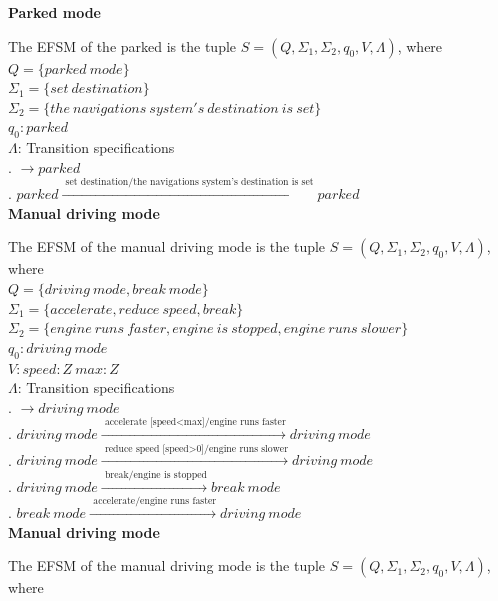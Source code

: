 \documentclass[12pt]{article}
\begin{document}
\begin{spacing}{1.5}
\newpage
\noindent \textbf{Parked mode}

\noindent The EFSM of the parked is the tuple $S = (Q, \Sigma_1, \Sigma_2, q_0, V, \Lambda)$, where\\

\noindent $Q = \{parked~mode\}$\\
\noindent $\Sigma_1 = \{set~destination\}$\\
\noindent $\Sigma_2 = \{the~navigations~system's~destination~is~set\}$\\
\noindent $q_0: parked$\\
\noindent $\Lambda$: Transition specifications\\
. $\rightarrow parked$\\
. $parked \xrightarrow {\text { set~destination/the~navigations~system's~destination~is~set}} parked$\\

\newpage
\noindent \textbf{Manual driving mode}

\noindent The EFSM of the manual driving mode is the tuple $S = (Q, \Sigma_1, \Sigma_2, q_0, V, \Lambda)$, where\\

\noindent $Q = \{driving~mode, break~mode\}$\\
\noindent $\Sigma_1 = \{accelerate,reduce~speed,break\}$\\
\noindent $\Sigma_2 = \{engine~runs~faster,engine~is~stopped,
engine~runs~slower\}$\\
\noindent $q_0: driving~mode$\\
\noindent $V: speed:Z~max:Z$\\
\noindent $\Lambda$: Transition specifications\\
. $\rightarrow driving~mode$\\
. $driving~mode \xrightarrow {\text { accelerate~[speed<max]/engine~runs~faster}} driving~mode$\\
. $driving~mode \xrightarrow {\text { reduce~speed~[speed>0]/engine~runs~slower}} driving~mode$\\
. $driving~mode \xrightarrow {\text { break/engine~is~stopped}} break~mode$\\
. $break~mode \xrightarrow {\text { accelerate/engine~runs~faster}} driving~mode$\\
\newpage
\noindent \textbf{Manual driving mode}

\noindent The EFSM of the manual driving mode is the tuple $S = (Q, \Sigma_1, \Sigma_2, q_0, V, \Lambda)$, where\\


\end{spacing}
\end{document}
